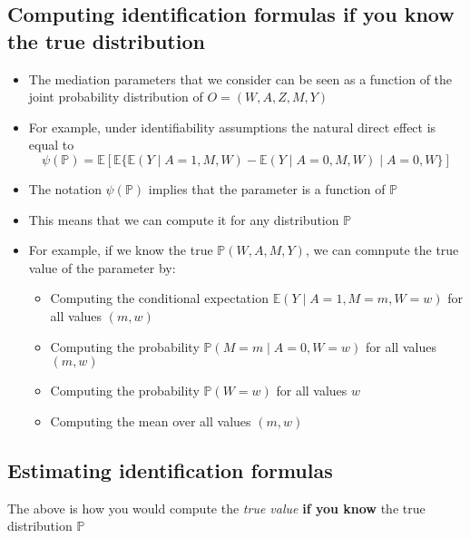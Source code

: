 \documentclass[
  12pt,
]{book}
\providecommand{\tightlist}{%
  \setlength{\itemsep}{0pt}\setlength{\parskip}{0pt}}
\theoremstyle{definition}
\theoremstyle{definition}
\theoremstyle{definition}
\renewcommand{\P}{\mathbb{P}}
\newcommand{\E}{\mathbb{E}}
\newcommand{\1}{\mathbbm{1}}
\begin{document}
\hypertarget{computing-identification-formulas-if-you-know-the-true-distribution}{%
\subsection{Computing identification formulas if you know the true distribution}\label{computing-identification-formulas-if-you-know-the-true-distribution}}

\begin{itemize}
\tightlist
\item
  The mediation parameters that we consider can be
  seen as a function of the joint probability distribution of \(O=(W,A,Z,M,Y)\)
\item
  For example, under identifiability assumptions the natural direct effect is
  equal to
  \begin{equation*}
    \psi(\P) =  \E[\E\{\E(Y \mid A=1, M, W) - \E(Y \mid A=0, M, W)\mid A=0,W\}]
  \end{equation*}
\item
  The notation \(\psi(\P)\) implies that the parameter is a function of \(\P\)
\item
  This means that we can compute it for any distribution \(\P\)
\item
  For example, if we know the true \(\P(W,A,M,Y)\), we can comnpute the true value
  of the parameter by:

  \begin{itemize}
  \tightlist
  \item
    Computing the conditional expectation \(\E(Y\mid A=1,M=m,W=w)\) for all
    values \((m,w)\)
  \item
    Computing the probability \(\P(M=m\mid A=0,W=w)\) for all values \((m,w)\)
  \item
    Computing the probability \(\P(W=w)\) for all values \(w\)
  \item
    Computing the mean over all values \((m,w)\)
  \end{itemize}
\end{itemize}

\hypertarget{estimating-identification-formulas}{%
\subsection{Estimating identification formulas}\label{estimating-identification-formulas}}

The above is how you would compute the \emph{true value} \textbf{if you know} the true
distribution \(\P\)
\end{document}
